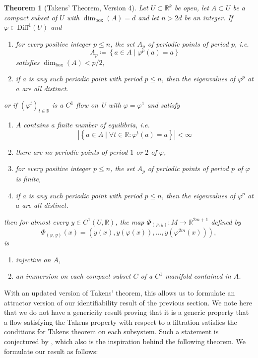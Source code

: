 \documentclass[11pt, a4paper]{memoir}
\theoremstyle{break}
\newtheorem{thm}{Theorem}
\theoremstyle{break}
\theoremstyle{nonumberplain}
\newcommand{\mR}{\mathbb{R}}
\newcommand{\abs}[1]{\left| #1\right|}
\begin{document}
\begin{thm}[Takens' Theorem, Version 4]\label{v4}
Let $U\subset \mR^k$ be open, let $A\subset U$ be a compact subset of $U$ with $\dim_\text{box}(A)=d$ and let $n>2d$ be an integer. If $\varphi\in\text{Diff}^1(U)$ and
\begin{enumerate}[label=\arabic*)]
	\item for every positive integer $p\leqslant n$, the set $A_p$ of periodic points of period $p$, i.e.
	$$A_p\coloneqq \left\{a\in A\mid \varphi^p(a)=a\right\}$$
	satisfies $\dim_\text{box}(A)<p/2$,
	\item if $a$ is any such periodic point with period $p\leqslant n$, then the eigenvalues of $\varphi^p$ at $a$ are all distinct.
\end{enumerate}
or if $(\varphi^t)_{t\in \mR}$ is a $C^1$ flow on U with $\varphi=\varphi^1$ and satisfy
\begin{enumerate}[label=\arabic*)]
	\item $A$ contains a finite number of equilibria, i.e.
	$$\abs{\left\{a\in A\mid \forall
	 t\in \mR: \varphi^t(a)=a\right\}}<\infty$$
	 \item there are no periodic points of period $1$ or $2$ of $\varphi$,
	\item for every positive integer $p\leqslant n$, the set $A_p$ of periodic points of period $p$ of $\varphi$ is finite,
	\item if $a$ is any such periodic point with period $p\leqslant n$, then the eigenvalues of $\varphi^p$ at $a$ are all distinct.
\end{enumerate}
then for almost every $y\in C^1(U,\mR)$, the map $\Phi_{(\varphi,y)}:M\to \mathbb{R}^{2m+1}$ defined by
$$\Phi_{(\varphi,y)}(x)=(y(x),y(\varphi(x)),...,y(\varphi^{2m}(x))),$$
is
\begin{enumerate}[label=\roman*)]
	\item injective on $A$,
	\item an immersion on each compact subset $C$ of a $C^1$ manifold contained in $A$.
\end{enumerate}
\end{thm} 
With an updated version of Takens' theorem, this allows us to formulate an attractor version of our identifiability result of the previous section. We note here that we do not have a genericity result proving that it is a generic property that a flow satisfying the Takens property with respect to a filtration satisfies the conditions for Takens theorem on each subsystem. Such a statement is conjectured by \cite{mathFound}, which also is the inspiration behind the following theorem. 
 We formulate our result as follows:
\end{document}
